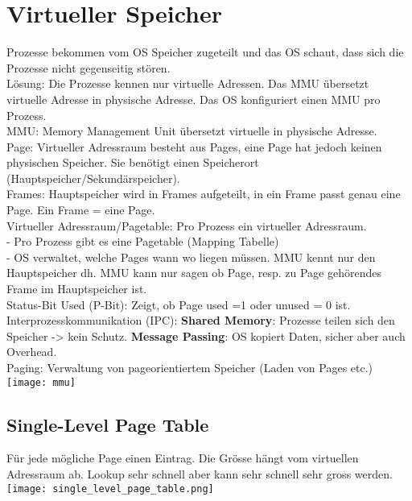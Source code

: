 \section{Virtueller Speicher}
Prozesse bekommen vom OS Speicher zugeteilt und das OS schaut, dass sich die Prozesse nicht gegenseitig stören.\\
\textcolor{myblue}{Lösung}: Die Prozesse kennen nur virtuelle Adressen. Das MMU übersetzt virtuelle Adresse in physische Adresse. Das OS konfiguriert einen MMU pro Prozess. \\
\textcolor{myblue}{MMU}: Memory Management Unit übersetzt virtuelle in physische Adresse.\\
\textcolor{myblue}{Page}: Virtueller Adressraum besteht aus Pages, eine Page hat jedoch keinen physischen Speicher. Sie benötigt einen Speicherort (Hauptspeicher/Sekundärspeicher).\\
\textcolor{myblue}{Frames}: Hauptspeicher wird in Frames aufgeteilt, in ein Frame passt genau eine Page. Ein Frame = eine Page.\\
\textcolor{myblue}{Virtueller Adressraum/Pagetable}: Pro Prozess ein virtueller Adressraum. \\
- Pro Prozess gibt es eine Pagetable (Mapping Tabelle)\\
- OS verwaltet, welche Pages wann wo liegen müssen. MMU kennt nur den
Hauptspeicher dh. MMU kann nur sagen ob Page, resp. zu Page
gehörendes Frame im Hauptspeicher ist.\\
\textcolor{myblue}{Status-Bit Used (P-Bit)}: Zeigt, ob Page used =1 oder unused = 0 ist.\\
\textcolor{myblue}{Interprozesskommunikation (IPC)}: \textbf{Shared Memory}: Prozesse teilen sich den
Speicher -> kein Schutz. \textbf{Message Passing}: OS kopiert Daten, sicher aber auch Overhead.\\
\textcolor{myblue}{Paging}: Verwaltung von pageorientiertem Speicher (Laden von Pages
etc.)\\
\texttt{[image: mmu]}
\subsection{Single-Level Page Table}
Für jede mögliche Page einen Eintrag. Die Grösse hängt vom virtuellen Adressraum ab. Lookup sehr schnell aber kann sehr schnell sehr gross werden.\\
\texttt{[image: single\_level\_page\_table.png]}
